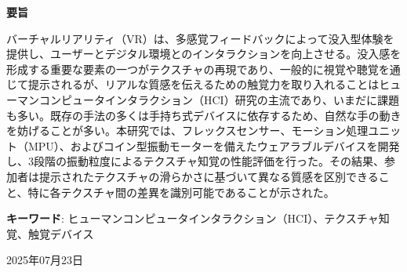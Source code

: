 \documentclass[uplatex,
12pt, %
a4paper,
english, %
oneside,
titlepage,
singlespacing, %
liststotoc, %
headsepline,
]{MastersDoctoralThesis} %
\begin{document}
\begin{center}
    \textbf{要旨} %
\end{center}
\vspace{0.5cm} %

		\begin{CJK*}{UTF8}{min}
			バーチャルリアリティ（VR）は、多感覚フィードバックによって没入型体験を提供し、ユーザーとデジタル環境とのインタラクションを向上させる。没入感を形成する重要な要素の一つがテクスチャの再現であり、一般的に視覚や聴覚を通じて提示されるが、リアルな質感を伝えるための触覚力を取り入れることはヒューマンコンピュータインタラクション（HCI）研究の主流であり、いまだに課題も多い。既存の手法の多くは手持ち式デバイスに依存するため、自然な手の動きを妨げることが多い。本研究では、フレックスセンサー、モーション処理ユニット（MPU）、およびコイン型振動モーターを備えたウェアラブルデバイスを開発し、3段階の振動粒度によるテクスチャ知覚の性能評価を行った。その結果、参加者は提示されたテクスチャの滑らかさに基づいて異なる質感を区別できること、特に各テクスチャ間の差異を識別可能であることが示された。
		\vspace{5mm}
		
		
		\textbf{キーワード}: ヒューマンコンピュータインタラクション（HCI）、テクスチャ知覚、触覚デバイス
		
		{}
		\end{CJK*}

\vspace{2cm} %
\begin{center}
  \begin{CJK*}{UTF8}{min}
      {2025年07月23日} %
      {}
		\end{CJK*}
\end{center}


		
\end{document}
